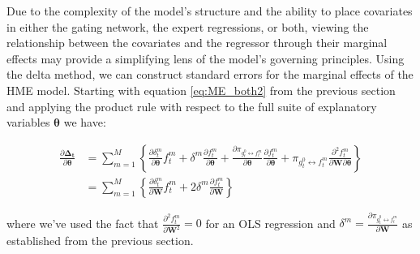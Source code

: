 \documentclass[12pt]{article}
\newcommand{\gateprod}[2]{\pi_{#1 \longleftrightarrow #2}}
\begin{document}
Due to the complexity of the model's structure and the ability to 
place covariates in either the gating network, the expert regressions,
or both, viewing the relationship between the covariates and the regressor
through their marginal effects may provide a simplifying lens of the 
model's governing principles. Using the delta method, we can construct standard
errors for the marginal effects of the HME model. Starting with equation
\ref{eq:ME_both2} from the previous section and applying the product rule with
respect to the full suite of explanatory variables $\boldsymbol{\theta}$ we have:

\begin{equation}
  \begin{split}
  \frac{\partial \boldsymbol{\Delta_{t}}}{\partial \boldsymbol{\theta}} &= \sum_{m=1}^{M} \left\{   \frac{\partial \delta^{m}_{t}}{\partial \boldsymbol{\theta}} f^{m}_{t}   +   \delta^{m} \frac{\partial f^{m}_{t}}{\partial \boldsymbol{\theta}}   +   \frac{\partial \gateprod{g^{0}_{t}}{f^{m}_{t}}}{\partial \boldsymbol{\theta}} \frac{\partial f^{m}_{t}}{\partial \boldsymbol{\theta}}    +   \gateprod{g^{0}_{t}}{f^{m}_{t}}  \frac{\partial^{2} f^{m}_{t}}{\partial \boldsymbol{W} \partial \boldsymbol{\theta}}   \right\}   \\
       &= \sum_{m=1}^{M} \left\{ \frac{\partial \delta^{m}_{t}}{\partial \boldsymbol{W}} f^{m}_{t} + 2 \delta^{m} \frac{\partial f^{m}_{t}}{\partial \boldsymbol{W}} \right\}
  \end{split}
\end{equation}

where we've used the fact that $\frac{\partial^{2} f^{m}_{t}}{\partial \boldsymbol{W}^{2}} = 0$
for an OLS regression and $\delta^{m} = \frac{\partial \gateprod{g^{0}_{t}}{f^{m}_{t}}}{\partial \boldsymbol{W}}$
as established from the previous section.

\newcommand{\deltavar}{%
  \begin{bmatrix}
    \boldsymbol{V}(\boldsymbol{\omega}^{0}) & \boldsymbol{0}                            & \boldsymbol{0}                            & \dots  \\ 
    \boldsymbol{0}                          & \boldsymbol{V}(\boldsymbol{\omega}^{1|0}) & \boldsymbol{0}                            & \dots  \\
    \boldsymbol{0}                          & \boldsymbol{0}                            & \boldsymbol{V}(\boldsymbol{\omega}^{2|0}) &        \\
    \vdots                                  & \vdots                                    &                                           & \ddots \\
  \end{bmatrix}
}
\end{document}
